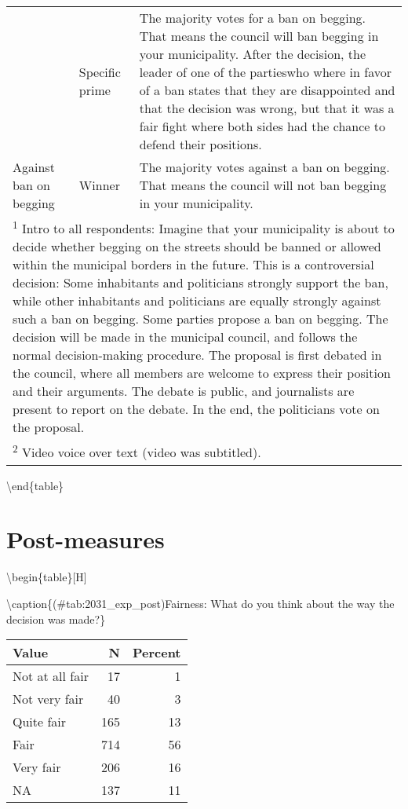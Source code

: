 \documentclass[
]{book}
\begin{document}
{\begin{tabular}[t]{lll}
 & Specific prime & The majority votes for a ban on begging. That means the council will ban begging in your municipality. After the decision, the leader of one of the partieswho where in favor of a ban states that they are disappointed and that the decision was wrong, but that it was a fair fight where both sides had the chance to defend their positions.\\

\multirow[t]{-5}{*}{\raggedright\arraybackslash Against ban on begging} & Winner & The majority votes against a ban on begging. That means the council will not ban begging in your municipality.\\
\bottomrule
\multicolumn{3}{l}{\textsuperscript{1} Intro to all respondents: Imagine that your municipality is about to decide whether begging on the streets should be banned or allowed within the municipal borders in the future. This is a controversial decision: Some inhabitants and politicians strongly support the ban, while other inhabitants and politicians are equally strongly against such a ban on begging. Some parties propose a ban on begging. The decision will be made in the municipal council, and follows the normal decision-making procedure. The proposal is  first debated in the council, where all members are welcome to express their position and their arguments. The debate is public, and journalists are present to report on the debate. In the end, the politicians vote on the proposal.}\\
\multicolumn{3}{l}{\textsuperscript{2} Video voice over text (video was subtitled).}\\
\end{tabular}}
\textbackslash end\{table\}

\hypertarget{post-measures}{%
\section{Post-measures}\label{post-measures}}

\textbackslash begin\{table\}{[}H{]}

\textbackslash caption\{(\#tab:2031\_exp\_post)Fairness: What do you think about the way the decision was made?\}
\centering

\begin{tabular}[t]{lrr}
\toprule
Value & N & Percent\\
\midrule
Not at all fair & 17 & 1\\
Not very fair & 40 & 3\\
Quite fair & 165 & 13\\
Fair & 714 & 56\\
Very fair & 206 & 16\\
NA & 137 & 11\\
\bottomrule
\end{tabular}
\end{document}
